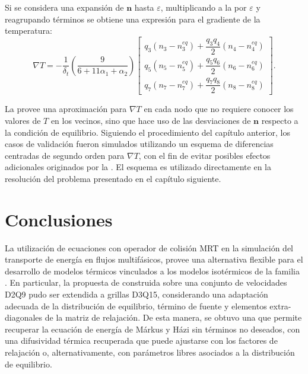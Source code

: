 Si se considera una expansi\'on de $\bm{n}$ hasta $\varepsilon$, multiplicando a la  por $\varepsilon$ y reagrupando t\'erminos se obtiene una expresi\'on para el gradiente de la temperatura:
\begin{equation}
	\nabla T= -\dfrac{1}{\delta_t}\left( \dfrac{9}{6+11\alpha_1+\alpha_2} \right)
	\left[ 
 	\begin{array}{c} 
 		q_3 (n_3 - n_3^{eq})  +  \dfrac{q_3q_4}{2} (n_4 - n_4^{eq}) \\[2mm]
 		q_5 (n_5 - n_5^{eq})  +  \dfrac{q_5q_6}{2} (n_6 - n_6^{eq}) \\[2mm]
 		q_7 (n_7 - n_7^{eq})  +  \dfrac{q_7q_8}{2} (n_8 - n_8^{eq})
 	\end{array} 
	\right].
	\label{eq:gradT_3d}
\end{equation}

La  provee una aproximaci\'on para $\nabla T$ en cada nodo que no requiere conocer los valores de $T$ en los vecinos, sino que hace uso de las desviaciones de $\bm{n}$ respecto a la condici\'on de equilibrio. Siguiendo el procedimiento del cap\'itulo anterior, los casos de validaci\'on fueron simulados utilizando un esquema de diferencias centradas de segundo orden para $\nabla T$, con el fin de evitar posibles efectos adicionales originados por la . El esquema es utilizado directamente en la resoluci\'on del problema presentado en el cap\'itulo siguiente.







\section{Conclusiones}

La utilizaci\'on de ecuaciones con operador de colisi\'on MRT en la simulaci\'on del transporte de energ\'ia en flujos multif\'asicos, provee una alternativa flexible para el desarrollo de modelos t\'ermicos vinculados a los modelos isot\'ermicos de la familia \pp{}. En particular, la propuesta de \lbe{} construida sobre una conjunto de velocidades D2Q9 pudo ser extendida a grillas D3Q15, considerando una adaptaci\'on adecuada de la distribuci\'on de equilibrio, t\'ermino de fuente y elementos extra-diagonales de la matriz de relajaci\'on. De esta manera, se obtuvo una \lbe{} que permite recuperar la ecuaci\'on de energ\'ia de M\'arkus y H\'azi sin t\'erminos no deseados, con una difusividad t\'ermica recuperada que puede ajustarse con los factores de relajaci\'on o, alternativamente, con par\'ametros libres asociados a la distribuci\'on de equilibrio.

